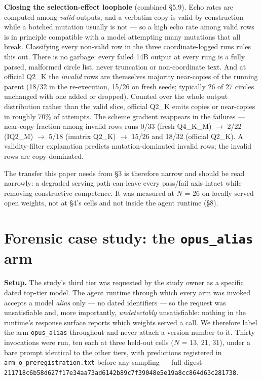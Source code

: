 \documentclass[11pt]{article}
\newcommand{\bk}{\discretionary{}{}{}}
\begin{document}
\textbf{Closing the selection-effect loophole} (combined \S5.9). Echo rates are computed among
\emph{valid} outputs, and a verbatim copy is valid by construction while a botched mutation
usually is not --- so a high echo rate among valid rows is in principle compatible with a
model attempting many mutations that all break. Classifying every non-valid row in the
three coordinate-logged runs rules this out. There is no garbage: every failed 14B output
at every rung is a fully parsed, malformed circle list, never truncation or non-coordinate
text. And at official Q2\_K the \emph{invalid} rows are themselves majority near-copies of the
running parent (18/32 in the re-execution, 15/26 on fresh seeds; typically 26 of 27
circles unchanged with one added or dropped). Counted over the whole output distribution
rather than the valid slice, official Q2\_K emits copies or near-copies in roughly 70\% of
attempts. The scheme gradient reappears in the failures --- near-copy fraction among invalid
rows runs 0/33 (fresh Q4\_K\_M) $\rightarrow$ 2/22 (IQ2\_M) $\rightarrow$ 5/18 (imatrix Q2\_K) $\rightarrow$ 15/26 and 18/32
(official Q2\_K). A validity-filter explanation predicts mutation-dominated invalid rows;
the invalid rows are copy-dominated.

The transfer this paper needs from \S3 is therefore narrow and should be read narrowly: a
degraded serving path can leave every pass/fail axis intact while removing constructive
competence. It was measured at $N$ = 26 on locally served open weights, not at \S4's cells and
not inside the agent runtime (\S8).

\section{Forensic case study: the \texorpdfstring{\texttt{opus\_alias}}{opus\_alias} arm}

\textbf{Setup.} The study's third tier was requested by the study owner as a specific dated
top-tier model. The agent runtime through which every arm was invoked accepts a model
\emph{alias} only --- no dated identifiers --- so the request was unsatisfiable and, more
importantly, \emph{undetectably} unsatisfiable: nothing in the runtime's response surface
reports which weights served a call. We therefore label the arm \texttt{opus\_alias} throughout
and never attach a version number to it. Thirty invocations were run, ten each at three
held-out cells ($N$ = 13, 21, 31), under a bare prompt identical to the other tiers, with
predictions registered in \texttt{arm\_o\_preregistration.txt} before any sampling --- full digest
\texttt{211718c6\bk b58d627f\bk 17e34aa7\bk 3ad6142b\bk 89c7f390\bk 48e5e19a\bk 8cc864d6\bk 3c281738}.
\end{document}
